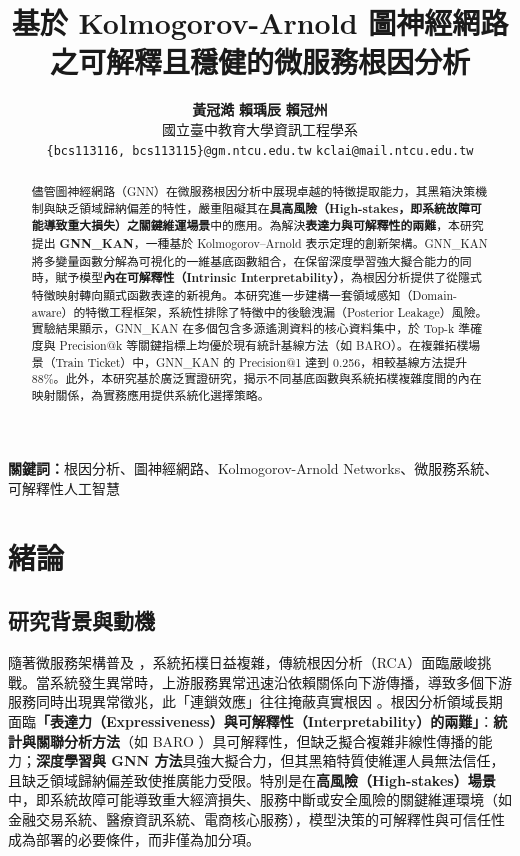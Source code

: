 \documentclass[10pt,a4paper,twocolumn]{article}
\title{基於 Kolmogorov-Arnold 圖神經網路之可解釋且穩健的微服務根因分析}
\author{
    \textbf{黃冠澔} \quad \textbf{賴瑀辰} \quad \textbf{賴冠州} \\[0.5em]
    國立臺中教育大學資訊工程學系 \\[0.3em]
    \texttt{\{bcs113116, bcs113115\}@gm.ntcu.edu.tw} \quad \texttt{kclai@mail.ntcu.edu.tw}
}
\date{}
\begin{document}
\maketitle

\begin{abstract}
\noindent
儘管圖神經網路（GNN）在微服務根因分析中展現卓越的特徵提取能力，其黑箱決策機制與缺乏領域歸納偏差的特性，嚴重阻礙其在\textbf{具高風險（High-stakes，即系統故障可能導致重大損失）之關鍵維運場景}中的應用。為解決\textbf{表達力與可解釋性的兩難}，本研究提出 \textbf{GNN\_KAN}，一種基於 Kolmogorov–Arnold 表示定理的創新架構。GNN\_KAN 將多變量函數分解為可視化的一維基底函數組合，在保留深度學習強大擬合能力的同時，賦予模型\textbf{內在可解釋性（Intrinsic Interpretability）}，為根因分析提供了從隱式特徵映射轉向顯式函數表達的新視角。本研究進一步建構一套領域感知（Domain-aware）的特徵工程框架，系統性排除了特徵中的後驗洩漏（Posterior Leakage）風險。實驗結果顯示，GNN\_KAN 在多個包含多源遙測資料的核心資料集中，於 Top-k 準確度與 Precision@k 等關鍵指標上均優於現有統計基線方法（如 BARO）。在複雜拓樸場景（Train Ticket）中，GNN\_KAN 的 Precision@1 達到 0.256，相較基線方法提升 88\%。此外，本研究基於廣泛實證研究，揭示不同基底函數與系統拓樸複雜度間的內在映射關係，為實務應用提供系統化選擇策略。
\end{abstract}

\noindent\textbf{關鍵詞：}根因分析、圖神經網路、Kolmogorov-Arnold Networks、微服務系統、可解釋性人工智慧

\vspace{0.5em}

\section{緒論}

\subsection{研究背景與動機}

隨著微服務架構普及 \cite{microservices_survey}，系統拓樸日益複雜，傳統根因分析（RCA）面臨嚴峻挑戰。當系統發生異常時，上游服務異常迅速沿依賴關係向下游傳播，導致多個下游服務同時出現異常徵兆，此「連鎖效應」往往掩蔽真實根因 \cite{train_ticket}。根因分析領域長期面臨\textbf{「表達力（Expressiveness）與可解釋性（Interpretability）的兩難」}：\textbf{統計與關聯分析方法}（如 BARO \cite{baro2023}）具可解釋性，但缺乏擬合複雜非線性傳播的能力；\textbf{深度學習與 GNN 方法}具強大擬合力，但其黑箱特質使維運人員無法信任，且缺乏領域歸納偏差致使推廣能力受限。特別是在\textbf{高風險（High-stakes）場景}中，即系統故障可能導致重大經濟損失、服務中斷或安全風險的關鍵維運環境（如金融交易系統、醫療資訊系統、電商核心服務），模型決策的可解釋性與可信任性成為部署的必要條件，而非僅為加分項。
\end{document}
